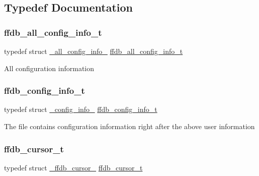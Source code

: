 \subsection{Typedef Documentation}
\mbox{\label{adat-devel_2other__libs_2filedb_2filehash_2ffdb__db_8h_afc17234e7cd387e11de55b92df6bb0e5}} 
\subsubsection{\texorpdfstring{ffdb\_all\_config\_info\_t}{ffdb\_all\_config\_info\_t}}
{\footnotesize\ttfamily typedef struct \mbox{\hyperlink{struct__all__config__info__}{\+\_\+all\+\_\+config\+\_\+info\+\_\+}} \mbox{\hyperlink{adat-devel_2other__libs_2filedb_2filehash_2ffdb__db_8h_afc17234e7cd387e11de55b92df6bb0e5}{ffdb\+\_\+all\+\_\+config\+\_\+info\+\_\+t}}}

All configuration information \mbox{\label{adat-devel_2other__libs_2filedb_2filehash_2ffdb__db_8h_acc961fbd2faf6a849a1620309100fda1}} 
\subsubsection{\texorpdfstring{ffdb\_config\_info\_t}{ffdb\_config\_info\_t}}
{\footnotesize\ttfamily typedef struct \mbox{\hyperlink{struct__config__info__}{\+\_\+config\+\_\+info\+\_\+}} \mbox{\hyperlink{adat-devel_2other__libs_2filedb_2filehash_2ffdb__db_8h_acc961fbd2faf6a849a1620309100fda1}{ffdb\+\_\+config\+\_\+info\+\_\+t}}}

The file contains configuration information right after the above user information \mbox{\label{adat-devel_2other__libs_2filedb_2filehash_2ffdb__db_8h_a1383f6fb3966b0ca74206ba93b687fd9}} 
\subsubsection{\texorpdfstring{ffdb\_cursor\_t}{ffdb\_cursor\_t}}
{\footnotesize\ttfamily typedef struct \mbox{\hyperlink{struct__ffdb__cursor__}{\+\_\+ffdb\+\_\+cursor\+\_\+}} \mbox{\hyperlink{adat-devel_2other__libs_2filedb_2filehash_2ffdb__db_8h_a1383f6fb3966b0ca74206ba93b687fd9}{ffdb\+\_\+cursor\+\_\+t}}}

